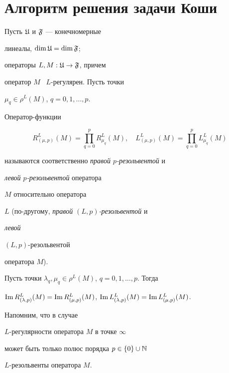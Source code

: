 \section{Алгоритм решения задачи Коши}





Пусть ${\frak U}$ и ${\frak F}$ --- конечномерные


линеалы, $\dim {\frak U} = \dim {\frak F}$;


операторы $L, M : {\frak U}\to {\frak F}$, причем


оператор $M$ \ $L$-регулярен. Пусть точки


$\mu_q\in\rho^L (M)$, $q=0, 1, \dotsc, p$.


Оператор-функции


$$


R^L_{(\mu, p)} (M) = \prod_{q=0}^p R_{\mu_q}^L (M),\quad


L^L_{(\mu, p)} (M) = \prod_{q=0}^p L_{\mu_q}^L (M)


$$


называются соответственно {\it правой $p$-резольвентой} и


{\it левой $p$-резольвентой} оператора


$M$ относительно оператора


$L$ (по-другому, {\it правой $(L, p)$-резольвентой} и {\it левой


$(L, p)$-резольвентой} оператора $M$).





\begin{thms}


Пусть точки $\lambda_q,\mu_q\in\rho^L (M)$, $q=0, 1, \dotsc, p$. Тогда 


$\im R^L_{(\lambda, p)} (M) = \im


R^L_{(\mu, p)} (M)$, $\im L^L_{(\lambda,


p)} (M) = \im L^L_{(\mu, p)} (M)$.


\end{thms}





Напомним, что в случае


$L$-регулярности оператора $M$ в точке $\infty$


может быть только полюс порядка $p\in\{0\}\cup{\Bbb N}$


$L$-резольвенты оператора $M$.





